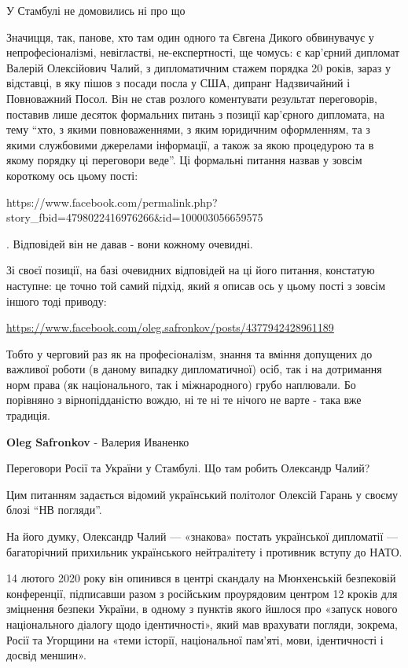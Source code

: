 \begin{itemize}
У Стамбулі не домовились ні про що


Значицця, так, панове, хто там один одного та Євгена Дикого обвинувачує у
непрофесіоналізмі, невігластві, не-експертності, ще чомусь: є кар'єрний
дипломат Валерій Олексійович Чалий, з дипломатичним стажем порядка 20 років,
зараз у відставці, в яку пішов з посади посла у США, дипранг Надзвичайний і
Повноважний Посол. Він не став розлого коментувати результат переговорів,
поставив лише десяток формальних питань з позиції кар'єрного дипломата, на тему
\enquote{хто, з якими повноваженнями, з яким юридичним оформленням, та з якими
службовими джерелами інформації, а також за якою процедурою та в якому порядку
ці переговори веде}. Ці формальні питання назвав у зовсім короткому ось цьому
пості:

https://www.facebook.com/permalink.php?story_fbid=4798022416976266&id=100003056659575

. Відповідей він не давав - вони кожному очевидні.

Зі своєї позиції, на базі очевидних відповідей на ці його питання, констатую
наступне: це точно той самий підхід, який я описав ось у цьому пості з зовсім
іншого тоді приводу:

\url{https://www.facebook.com/oleg.safronkov/posts/4377942428961189}

Тобто у черговий раз як на професіоналізм, знання та вміння допущених до
важливої роботи (в даному випадку дипломатичної) осіб, так і на дотримання норм
права (як національного, так і міжнародного) грубо наплювали. Бо порівняно з
вірнопідданістю вождю, ні те ні те нічого не варте - така вже традиція.

\begin{itemize} %
\textbf{Oleg Safronkov} - Валерия Иваненко

Переговори Росії та України у Стамбулі. Що там робить Олександр Чалий?

Цим питанням задається відомий український політолог Олексій Гарань у своєму
блозі \enquote{НВ погляди}.

На його думку, Олександр Чалий — «знакова» постать української дипломатії —
багаторічний прихильник українського нейтралітету і противник вступу до НАТО.

14 лютого 2020 року він опинився в центрі скандалу на Мюнхенській безпековій
конференції, підписавши разом з російським проурядовим центром 12 кроків для
зміцнення безпеки України, в одному з пунктів якого йшлося про «запуск нового
національного діалогу щодо ідентичності», який мав врахувати погляди, зокрема,
Росії та Угорщини на «теми історії, національної пам’яті, мови, ідентичності і
досвід меншин».


\end{itemize}
\end{itemize}
